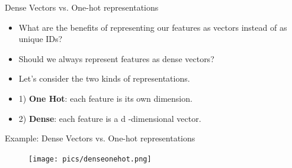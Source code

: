 \documentclass[handout]{beamer}
\begin{document}
\begin{frame}{Dense Vectors vs. One-hot representations}
\begin{scriptsize}


\begin{itemize}

\item What are the benefits of representing our features as vectors instead of as unique IDs?
\item Should we always represent features as dense vectors? 
\item Let's consider the two kinds of representations.

\item 1) \textbf{One Hot}: each feature is its own dimension. 
\begin{itemize}
\end{itemize}

\item 2) \textbf{Dense}: each feature is a d -dimensional vector. 
\begin{itemize}
\end{itemize}


\end{itemize}
\end{scriptsize}
\end{frame}


\begin{frame}{Example: Dense Vectors vs. One-hot representations}




\begin{figure}[htb]
	\centering
	 \texttt{[image: pics/denseonehot.png]}
\end{figure}


\end{frame}
\end{document}
